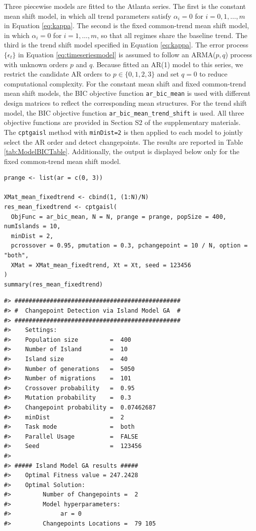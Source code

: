 Three piecewise models are fitted to the Atlanta series. The first is the constant mean shift model, in which all trend parameters satisfy \(\alpha_i=0\) for \(i=0,1,\ldots,m\) in Equation \eqref{eq:kappa}. The second is the fixed common-trend mean shift model, in which \(\alpha_i=0\) for \(i=1,\ldots,m\), so that all regimes share the baseline trend. The third is the trend shift model specified in Equation \eqref{eq:kappa}. The error process \(\{\epsilon_t\}\) in Equation \eqref{eq:timeseriesmodel} is assumed to follow an ARMA(\(p,q\)) process with unknown orders \(p\) and \(q\). Because \citet{lund2023good} fitted an AR(1) model to this series, we restrict the candidate AR orders to \(p \in \{0,1,2,3\}\) and set \(q=0\) to reduce computational complexity. For the constant mean shift and fixed common-trend mean shift models, the BIC objective function \texttt{ar\_bic\_mean} is used with different design matrices to reflect the corresponding mean structures. For the trend shift model, the BIC objective function \texttt{ar\_bic\_mean\_trend\_shift} is used. All three objective functions are provided in Section S2 of the supplementary materials. The \texttt{cptgaisl} method with \texttt{minDist=2} is then applied to each model to jointly select the AR order and detect changepoints. The results are reported in Table \ref{tab:ModelBICTable}. Additionally, the output is displayed below only for the fixed common-trend mean shift model.

\begin{verbatim}
prange <- list(ar = c(0, 3))

XMat_mean_fixedtrend <- cbind(1, (1:N)/N)
res_mean_fixedtrend <- cptgaisl(
  ObjFunc = ar_bic_mean, N = N, prange = prange, popSize = 400, numIslands = 10,
  minDist = 2,
  pcrossover = 0.95, pmutation = 0.3, pchangepoint = 10 / N, option = "both",
  XMat = XMat_mean_fixedtrend, Xt = Xt, seed = 123456
)
summary(res_mean_fixedtrend)
\end{verbatim}

\begin{verbatim}
#> ###############################################
#> #  Changepoint Detection via Island Model GA  #
#> ###############################################
#>    Settings: 
#>    Population size         =  400 
#>    Number of Island        =  10 
#>    Island size             =  40 
#>    Number of generations   =  5050 
#>    Number of migrations    =  101 
#>    Crossover probability   =  0.95 
#>    Mutation probability    =  0.3 
#>    Changepoint probability =  0.07462687 
#>    minDist                 =  2 
#>    Task mode               =  both 
#>    Parallel Usage          =  FALSE 
#>    Seed                    =  123456 
#> 
#> ##### Island Model GA results ##### 
#>    Optimal Fitness value = 247.2428 
#>    Optimal Solution: 
#>         Number of Changepoints =  2 
#>         Model hyperparameters:
#>              ar = 0 
#>         Changepoints Locations =  79 105
\end{verbatim}

